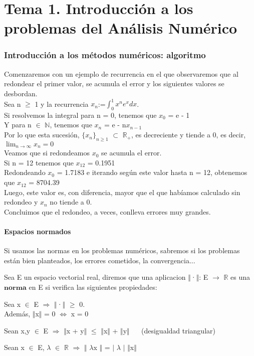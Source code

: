 \part{Tema 1. Introducción a los problemas del Análisis Numérico}

\section{Introducción a los métodos numéricos: algoritmo}
Comenzaremos con un ejemplo de recurrencia en el que observaremos que al redondear el primer valor, se acumula el error y los siguientes valores se desbordan.\\
Sea n $\geq$ 1 y la recurrencia $x_{n}$:=$\int_{0}^{1} x^{n}e^{x}dx$.\\
Si resolvemos la integral para n = 0, tenemos que $x_{0}$ = e - 1\\
Y para n $\in$ $\mathbb{N}$, tenemos que $x_{n}$ = e - n$x_{n-1}$\\
Por lo que esta sucesión, $\lbrace x_{n} \rbrace_{n\geq1}$ $\subset$ $\mathbb{R_{+}}$, es decreciente y tiende a 0, es decir, $ \lim_{n \to \infty} x_{n} = 0 $ \\
Veamos que si redondeamos $x_{0}$ se acumula el error.\\
Si n = 12 tenemos que $x_{12}$ = 0.1951\\
Redondeando $x_{0}$ = 1.7183 e iterando según este valor hasta n = 12, obtenemos que $x_{12}$ = 8704.39\\
Luego, este valor es, con diferencia, mayor que el que habíamos calculado sin redondeo y $x_{n}$ no tiende a 0.\\
Concluimos que el redondeo, a veces, conlleva errores muy grandes.

\subsection{Espacios normados}
Si usamos las normas en los problemas numéricos, sabremos si los problemas están bien planteados, los errores cometidos, la convergencia...

\begin{ndef}[Norma]
Sea E un espacio vectorial real, diremos que una aplicacion $\Vert$·$\Vert$: E $\rightarrow$ $\mathbb{R}$ es una $\textbf{norma}$ en E si verifica las siguientes propiedades:
	\begin{nlist}
	\item Sea x $\in$ E $\Rightarrow$ $\Vert$·$\Vert$ $\geq$ 0.\\
	Además, $\Vert$x$\Vert$ = 0 $\Leftrightarrow$ x = 0
	\item Sean x,y $\in$ E $\Rightarrow$ $\Vert$x + y$\Vert$ $\leq$ $\Vert$x$\Vert$ + $\Vert$y$\Vert$ $\quad$ (desigualdad triangular)
	\item Sean x $\in$ E, $\lambda$ $\in$ $\mathbb{R}$ $\Rightarrow$ $\Vert$ $	\lambda$x $\Vert$ = $\vert$ $\lambda$ $\vert$ $\Vert$x$\Vert$
	\end{nlist}
\end{ndef}

